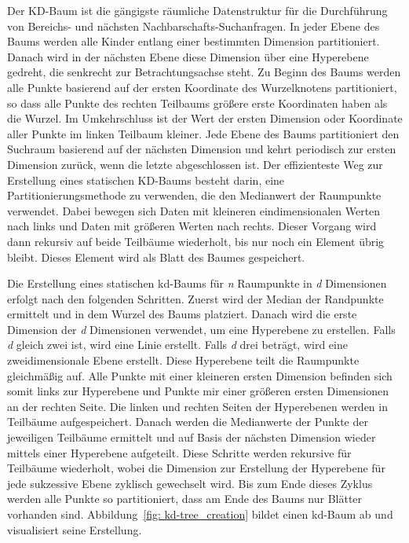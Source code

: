 Der KD-Baum ist die gängigste räumliche Datenstruktur für die Durchführung von Bereichs- und nächsten Nachbarschafts-Suchanfragen. In jeder Ebene des Baums werden alle Kinder entlang einer bestimmten Dimension partitioniert. Danach wird in der nächsten Ebene diese Dimension über eine Hyperebene gedreht, die senkrecht zur Betrachtungsachse steht. Zu Beginn des Baums werden alle Punkte basierend auf der ersten Koordinate des Wurzelknotens partitioniert, so dass alle Punkte des rechten Teilbaums größere erste Koordinaten haben als die Wurzel. Im Umkehrschluss ist der Wert der ersten Dimension oder Koordinate aller Punkte im linken Teilbaum kleiner. Jede Ebene des Baums partitioniert den Suchraum basierend auf der nächsten Dimension und kehrt periodisch zur ersten Dimension zurück, wenn die letzte abgeschlossen ist. Der effizienteste Weg zur Erstellung eines statischen KD-Baums besteht darin, eine Partitionierungsmethode zu verwenden, die den Medianwert der Raumpunkte verwendet. Dabei bewegen sich Daten mit kleineren eindimensionalen Werten nach links und Daten mit größeren Werten nach rechts. Dieser Vorgang wird dann rekursiv auf beide Teilbäume wiederholt, bis nur noch ein Element übrig bleibt. Dieses Element wird als Blatt des Baumes gespeichert. \autocite[92]{saha_advanced_2019}

Die Erstellung eines statischen kd-Baums für \textit{n} Raumpunkte in \textit{d} Dimensionen erfolgt nach den folgenden Schritten. Zuerst wird der Median der Randpunkte ermittelt und in dem Wurzel des Baums platziert. Danach wird die erste Dimension der \textit{d} Dimensionen verwendet, um eine Hyperebene zu erstellen. Falls \textit{d} gleich zwei ist, wird eine Linie erstellt. Falls \textit{d} drei beträgt, wird eine zweidimensionale Ebene erstellt. Diese Hyperebene teilt die Raumpunkte gleichmäßig auf. Alle Punkte mit einer kleineren ersten Dimension befinden sich somit links zur Hyperebene und Punkte mir einer größeren ersten Dimensionen an der rechten Seite. Die linken und rechten Seiten der Hyperebenen werden in Teilbäume aufgespeichert. Danach werden die Medianwerte der Punkte der jeweiligen Teilbäume ermittelt und auf Basis der nächsten Dimension wieder mittels einer Hyperebene aufgeteilt. Diese Schritte werden rekursive für Teilbäume wiederholt, wobei die Dimension zur Erstellung der Hyperebene für jede sukzessive Ebene zyklisch gewechselt wird. Bis zum Ende dieses Zyklus werden alle Punkte so partitioniert, dass am Ende des Baums nur Blätter vorhanden sind. Abbildung~\ref{fig: kd-tree_creation} bildet einen kd-Baum ab und visualisiert seine Erstellung. \autocite[93-94]{saha_advanced_2019} 


